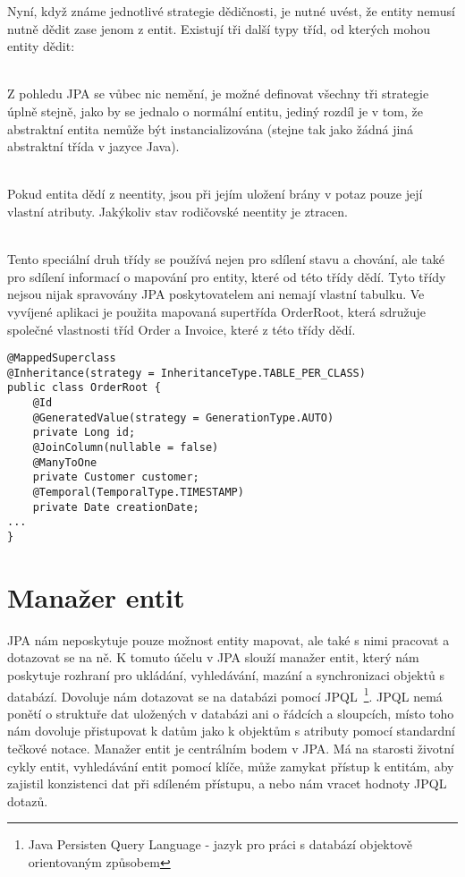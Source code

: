 \documentclass[122pt,oneside]{fithesis}
\begin{document}
Nyní, když známe jednotlivé strategie dědičnosti, je nutné uvést, že entity nemusí nutně dědit zase jenom z entit. Existují tři další typy tříd, od kterých mohou entity dědit:

\vspace{5 mm}
\\\indent Z pohledu JPA se vůbec nic nemění, je možné definovat všechny tři strategie úplně stejně, jako by se jednalo o normální entitu, jediný rozdíl je v tom, že abstraktní entita nemůže být instancializována (stejne tak jako žádná jiná abstraktní třída v jazyce Java).

\vspace{5 mm}
\\\indent Pokud entita dědí z neentity, jsou při jejím uložení brány v potaz pouze její vlastní atributy. Jakýkoliv stav rodičovské neentity je ztracen.

\vspace{5 mm}
\\\indent Tento speciální druh třídy se používá nejen pro sdílení stavu a chování, ale také pro sdílení informací o mapování pro entity, které od této třídy dědí. Tyto třídy nejsou nijak spravovány JPA poskytovatelem ani nemají vlastní tabulku. Ve vyvíjené aplikaci je použita mapovaná supertřída OrderRoot, která sdružuje společné vlastnosti tříd Order a Invoice, které z této třídy dědí.

\begin{lstlisting}
@MappedSuperclass
@Inheritance(strategy = InheritanceType.TABLE_PER_CLASS)
public class OrderRoot {
	@Id
	@GeneratedValue(strategy = GenerationType.AUTO)
	private Long id;
	@JoinColumn(nullable = false)
	@ManyToOne
	private Customer customer;
	@Temporal(TemporalType.TIMESTAMP)
	private Date creationDate;
...
}
\end{lstlisting}

\section{Manažer entit}

JPA nám neposkytuje pouze možnost entity mapovat, ale také s nimi pracovat a dotazovat se na ně. K tomuto účelu v JPA slouží manažer entit, který nám poskytuje rozhraní pro ukládání, vyhledávání, mazání a synchronizaci objektů s databází. Dovoluje nám dotazovat se na databázi pomocí JPQL~\footnote{Java Persisten Query Language - jazyk pro práci s databází objektově orientovaným způsobem}. JPQL nemá ponětí o struktuře dat uložených v databázi ani o řádcích a sloupcích, místo toho nám dovoluje přistupovat k datům jako k objektům s atributy pomocí standardní tečkové notace. Manažer entit je centrálním bodem v JPA. Má na starosti životní cykly entit, vyhledávání entit pomocí klíče, může zamykat přístup k entitám, aby zajistil konzistenci dat při sdíleném přístupu, a nebo nám vracet hodnoty JPQL dotazů.
\end{document}
